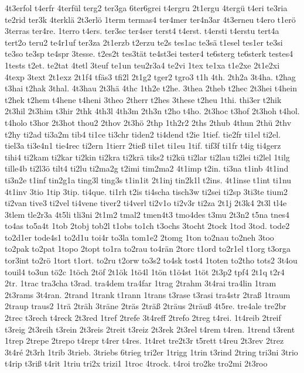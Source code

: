 {4t3erfol
t4erfr
4terfül
terg2
ter3ga
6ter6grei
t4ergru
2t1ergu
4tergü
t4eri
te3ria
te2rid
ter3k
4terklä
2t3erlö
1term
termas4
ter4mer
ter4n3ar
4t3erneu
t4ero
t1erö
3terras
ter4re.
1terro
t4ers.
ter3sc
ter4ser
terst4
t4erst.
t4ersti
t4erstu
tert4a
tert2o
teru2
te4r1uf
ter3za
2t1erzb
t2erzu
te2s
tes1ac
te3sä
t1esel
tes1er
te3si
te3so
te3sp
te4spr
3tesse.
t2es2t
tes3tät
te4st3ei
tester4
te6sterg
te6sterk
testes4
1tests
t2et.
te2tat
4tetl
3teuf
te1un
teu2r3a4
te2vi
1tex
te1xa
t1e2xe
2t1e2xi
4texp
3text
2t1exz
2t1f4
tfäs3
tfi2l
2t1g2
tger2
tgro3
t1h
4th.
2th2a
3t4ha.
t2hag
t3hai
t2hak
3thal.
4t3hau
2t3hä
4thc
1th2e
t2he.
3thea
2theb
t2hec
2t3hei
t4hein
t2hek
t2hem
t4hene
t4heni
3theo
2therr
t2hes
3these
t2heu
1thi.
thi3er
t2hik
2t3hil
2t3him
t3hir
2thk
4th3l
4th3m
2th3n
t2ho
t4ho.
2t3hoc
t3hof
2t3hoh
t4hol.
t4holo
t3hor
2t3hot
thou2
2thov
2t3hö
2thp
1th2r2
2ths
2thub
4thun
2thü
2thv
t2hy
ti2ad
ti3a2m
tib4
ti1ce
ti3chr
tiden2
ti4dend
t2ie
1tief.
tie2fr
ti1el
ti2el.
tiel3a
ti3e4n1
tie4rec
ti2ern
1tierr
2tieß
ti1et
ti1eu
1tif.
tif3f
ti1fr
t4ig
ti4gerz
tihi4
ti2kam
ti2kar
ti2kin
ti2kra
ti2krä
tiks2
ti2kü
ti2lar
ti2lau
ti2lei
ti2lel
1tilg
tille4b
ti2l3ö
tilt4
ti2lu
ti2ma2g
t2imi
tim2ma2
4t1imp
t2in.
ti3na
t1inb
4t1ind
ti3n2e
t1inf
tin2g1a
ting3l
ting3s
t1in1it
2t1inj
tin2k1l
t2ins.
4t1inse
t1int
ti1nu
4t1inv
3tio
1tip
3tip.
ti4que.
ti1rh
t2is
ti4scha
tisch3w
ti2sei
ti2sp
3ti3te
tium2
ti2van
tive3
ti2vel
ti4vene
tiver2
ti4verl
ti2v1o
ti2v3r
ti2za
2t1j
2t3k4
2t3l
tl4e
3tlem
tle2r3a
4t5li
tli3ni
2t1m2
tmal2
tmen4t3
tmo4des
t3mu
2t3n2
t5na
tnes4
to4as
to5a4t
1tob
2tobj
tob2l
t1obs
to1ch
t3ochs
3tocht
2tock
1tod
3tod.
tode2
to2d1er
tode4s1
to2d1u
toi4r
to3la
tom1e2
2tomg
1ton
to2nau
to2neh
3too
to2pak
to2pat
1topo
2topt
to1ra
to2rau
to4rän
2torc
t1ord
to2r1el
t1org
t3orga
tor3int
to2rö
1tort
t1ort.
to2ru
t2orw
to3s2
to4sk
tost4
1toten
to2tho
tots2
3t4ou
touil4
to3un
tö2c
1töch
2töf
2t1ök
1tö4l
1tön
t1ö4st
1töt
2t3p2
tpf4
2t1q
t2r4
2tr.
1trac
tra3cha
t3rad.
tra4dem
tra4far
1trag
2trahm
3t4rai
tra4lin
1tram
2t3rams
3t4ran.
2trand
1trank
t1rann
1trans
t3rase
t3rasi
tra4str
2traß
1traum
2traup
traus2
1trä
2träh
3träne
2träs
2träß
2träus
2träuß
4t5re.
tre4ale
tre2br
2trec
t3rech
t4reck
2t3red
1tref
2trefe
3t4reff
2trefo
2treg
t4rei.
1t4reib
2treif
t3reig
2t3reih
t3rein
2t3reis
2treit
t3reiz
2t3rek
2t3rel
t4rem
t4ren.
1trend
t3rent
1trep
2trepe
2trepo
t4repr
t4rer
t4res.
1t4ret
tre2t3r
t5rett
t4reu
2t3rev
2trez
3t4ré
2t3rh
1trib
3trieb.
3triebs
6trieg
tri2er
1trigg
1trin
t3rind
2tring
tri3ni
3trio
t4rip
t3riß
t4rit
1triu
tri2x
trizi1
1troc
4trock.
t4roi
tro2ke
tro2mi
2t3roo
}
